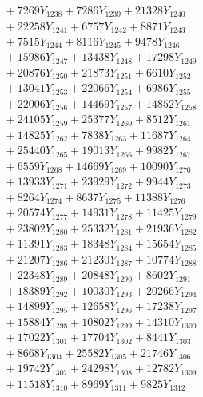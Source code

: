 \documentclass[a4paper,10pt]{article}
\begin{document}
{\begin{align}
&\;  + 7269 Y_{1238} + 7286 Y_{1239} + 21328 Y_{1240} \\[0.3ex]
&\;  + 22258 Y_{1241} + 6757 Y_{1242} + 8871 Y_{1243} \\[0.3ex]
&\;  + 7515 Y_{1244} + 8116 Y_{1245} + 9478 Y_{1246} \\[0.3ex]
&\;  + 15986 Y_{1247} + 13438 Y_{1248} + 17298 Y_{1249} \\[0.3ex]
&\;  + 20876 Y_{1250} + 21873 Y_{1251} + 6610 Y_{1252} \\[0.3ex]
&\;  + 13041 Y_{1253} + 22066 Y_{1254} + 6986 Y_{1255} \\[0.3ex]
&\;  + 22006 Y_{1256} + 14469 Y_{1257} + 14852 Y_{1258} \\[0.5ex]\allowbreak
&\;  + 24105 Y_{1259} + 25377 Y_{1260} + 8512 Y_{1261} \\[0.3ex]
&\;  + 14825 Y_{1262} + 7838 Y_{1263} + 11687 Y_{1264} \\[0.3ex]
&\;  + 25440 Y_{1265} + 19013 Y_{1266} + 9982 Y_{1267} \\[0.3ex]
&\;  + 6559 Y_{1268} + 14669 Y_{1269} + 10090 Y_{1270} \\[0.3ex]
&\;  + 13933 Y_{1271} + 23929 Y_{1272} + 9944 Y_{1273} \\[0.3ex]
&\;  + 8264 Y_{1274} + 8637 Y_{1275} + 11388 Y_{1276} \\[0.3ex]
&\;  + 20574 Y_{1277} + 14931 Y_{1278} + 11425 Y_{1279} \\[0.3ex]
&\;  + 23802 Y_{1280} + 25332 Y_{1281} + 21936 Y_{1282} \\[0.3ex]
&\;  + 11391 Y_{1283} + 18348 Y_{1284} + 15654 Y_{1285} \\[0.3ex]
&\;  + 21207 Y_{1286} + 21230 Y_{1287} + 10774 Y_{1288} \\[0.5ex]\allowbreak
&\;  + 22348 Y_{1289} + 20848 Y_{1290} + 8602 Y_{1291} \\[0.3ex]
&\;  + 18389 Y_{1292} + 10030 Y_{1293} + 20266 Y_{1294} \\[0.3ex]
&\;  + 14899 Y_{1295} + 12658 Y_{1296} + 17238 Y_{1297} \\[0.3ex]
&\;  + 15884 Y_{1298} + 10802 Y_{1299} + 14310 Y_{1300} \\[0.3ex]
&\;  + 17022 Y_{1301} + 17704 Y_{1302} + 8441 Y_{1303} \\[0.3ex]
&\;  + 8668 Y_{1304} + 25582 Y_{1305} + 21746 Y_{1306} \\[0.3ex]
&\;  + 19742 Y_{1307} + 24298 Y_{1308} + 12782 Y_{1309} \\[0.3ex]
&\;  + 11518 Y_{1310} + 8969 Y_{1311} + 9825 Y_{1312} \\[0.3ex]

\end{align}}
\end{document}
